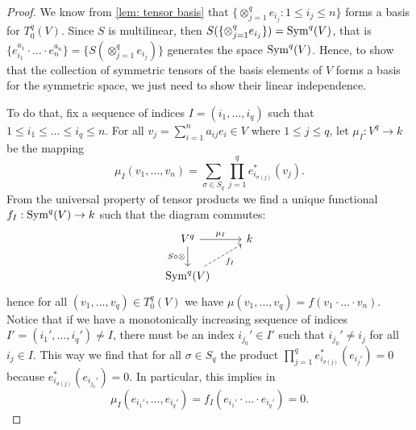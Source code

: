 \begin{proof}
    We know from \cref{lem: tensor basis} that \(\{\otimes_{j=1}^q e_{i_j} \colon 1 \leq
    i_j \leq n\}\) forms a basis for \(T_0^q(V)\). Since \(S\) is multilinear,
    then \(S(\{\otimes_{j=1}^q e_{i_j}\}) = \operatorname{Sym}^q(V)\), that is \(\{e_{i_1}^{a_1}
    \cdot \ldots \cdot e_n^{a_n}\} = \{S(\otimes_{j=1}^q e_{i_j})\}\) generates
    the space \(\operatorname{Sym}^q(V)\). Hence, to show that the collection of symmetric
    tensors of the basis elements of \(V\) forms a basis for the symmetric space,
    we just need to show their linear independence.

    To do that, fix a sequence of indices \(I = (i_1, \dots, i_q)\) such that  \(1
    \leq i_1 \leq \dots \leq i_q \leq n\). For all \(v_j = \sum_{i=1}^n a_{ij} e_i
    \in V\) where \(1 \leq j \leq q\), let \(\mu_I: V^q \to k\) be the mapping
    \[
        \mu_I(v_1, \dots, v_n) = \sum_{\sigma \in S_q} \prod_{j=1}^q
        e_{i_{\sigma(j)}}^*(v_j).
    \]
    From the universal property of tensor products we find a unique
    functional \(f_I: \operatorname{Sym}^q(V) \to k\) such that the diagram commutes:
    \[
        \begin{tikzcd}
            V^q \ar[r, "\mu_I"] \ar[d, swap, "S \circ \otimes"] &k \\
            \Sym^q(V) \ar[ru, swap, dashed, "f_I"]
        \end{tikzcd}
    \]
    hence for all \((v_1, \dots, v_q) \in T_0^q(V)\) we have \(\mu(v_1, \dots,
    v_q) = f(v_1 \cdot \ldots \cdot v_n)\). Notice that if we have a monotonically
    increasing sequence of indices \(I' = (i_1', \dots, i_q') \neq I\), there must
    be an index \(i_{j_0}' \in I'\) such that \(i_{j_0}' \neq i_j\) for all \(i_j
    \in I\). This way we find that for all \(\sigma \in S_q\) the product
    \(\prod_{j=1}^q e_{i_{\sigma(j)}}^*(e_{i_j'}) = 0\) because
    \(e_{i_{\sigma(j)}}^*(e_{i_{j_0}'}) = 0\). In particular, this implies in
    \[
        \mu_I(e_{i_1'}, \dots, e_{i_q'}) = f_I(e_{i_1'} \cdot \ldots \cdot e_{i_q'})
        = 0.
    \]


\end{proof}
